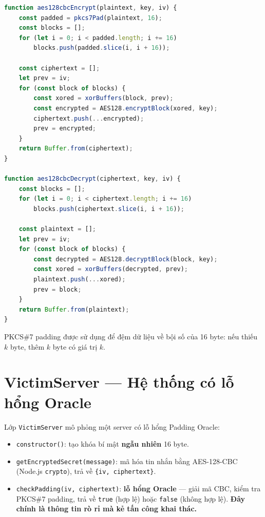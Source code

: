 \begin{lstlisting}[language=JavaScript, caption={Hàm aes128cbcEncrypt và aes128cbcDecrypt}, label=lst:cbc]
function aes128cbcEncrypt(plaintext, key, iv) {
    const padded = pkcs7Pad(plaintext, 16);
    const blocks = [];
    for (let i = 0; i < padded.length; i += 16)
        blocks.push(padded.slice(i, i + 16));

    const ciphertext = [];
    let prev = iv;
    for (const block of blocks) {
        const xored = xorBuffers(block, prev);
        const encrypted = AES128.encryptBlock(xored, key);
        ciphertext.push(...encrypted);
        prev = encrypted;
    }
    return Buffer.from(ciphertext);
}

function aes128cbcDecrypt(ciphertext, key, iv) {
    const blocks = [];
    for (let i = 0; i < ciphertext.length; i += 16)
        blocks.push(ciphertext.slice(i, i + 16));

    const plaintext = [];
    let prev = iv;
    for (const block of blocks) {
        const decrypted = AES128.decryptBlock(block, key);
        const xored = xorBuffers(decrypted, prev);
        plaintext.push(...xored);
        prev = block;
    }
    return Buffer.from(plaintext);
}
\end{lstlisting}

PKCS\#7 padding được sử dụng để đệm dữ liệu về bội số của 16 byte: nếu thiếu $k$ byte, thêm $k$ byte có giá trị $k$.

\section{VictimServer --- Hệ thống có lỗ hổng Oracle}
\label{sec:impl-victim}

Lớp \texttt{VictimServer} mô phỏng một server có lỗ hổng Padding Oracle:

\begin{itemize}
    \item \texttt{constructor()}: tạo khóa bí mật \textbf{ngẫu nhiên} 16 byte.
    \item \texttt{getEncryptedSecret(message)}: mã hóa tin nhắn bằng AES-128-CBC (Node.js \texttt{crypto}), trả về \texttt{\{iv, ciphertext\}}.
    \item \texttt{checkPadding(iv, ciphertext)}: \textbf{lỗ hổng Oracle} --- giải mã CBC, kiểm tra PKCS\#7 padding, trả về \texttt{true} (hợp lệ) hoặc \texttt{false} (không hợp lệ). \textbf{Đây chính là thông tin rò rỉ mà kẻ tấn công khai thác.}
\end{itemize}

